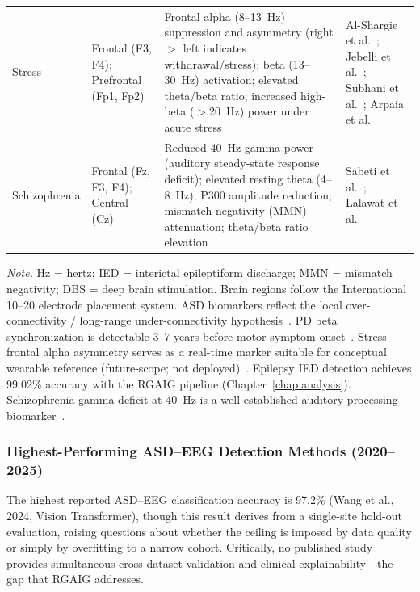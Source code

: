 \begin{table}[H]
\begin{tabularx}{\textwidth}{@{} >{\raggedright\arraybackslash}p{2.0cm} >{\raggedright\arraybackslash}p{2.0cm} L L @{}}
\addlinespace
Stress & Frontal (F3, F4); Prefrontal (Fp1, Fp2) & Frontal alpha (8--13~Hz) suppression and asymmetry (right $>$ left indicates withdrawal/stress); beta (13--30~Hz) activation; elevated theta/beta ratio; increased high-beta ($>$20~Hz) power under acute stress & Al-Shargie et al.~\cite{alshargie2018mental}; Jebelli et al.~\cite{jebelli2018eeg}; Subhani et al.~\cite{subhani2017stress}; Arpaia et al.~\cite{arpaia2020wearable} \\
\addlinespace
Schizophrenia & Frontal (Fz, F3, F4); Central (Cz) & Reduced 40~Hz gamma power (auditory steady-state response deficit); elevated resting theta (4--8~Hz); P300 amplitude reduction; mismatch negativity (MMN) attenuation; theta/beta ratio elevation & Sabeti et al.~\cite{sabeti2009entropy}; Lalawat et al.~\cite{lalawat2025fmri} \\
\bottomrule
\end{tabularx}
\vspace{0.5em}\noindent\textit{Note.} Hz = hertz; IED = interictal epileptiform discharge; MMN = mismatch negativity; DBS = deep brain stimulation. Brain regions follow the International 10--20 electrode placement system. ASD biomarkers reflect the local over-connectivity / long-range under-connectivity hypothesis~\cite{duffy2012coherence}. PD beta synchronization is detectable 3--7 years before motor symptom onset~\cite{geraedts2018eeg}. Stress frontal alpha asymmetry serves as a real-time marker suitable for conceptual wearable reference (future-scope; not deployed)~\cite{arpaia2020wearable}. Epilepsy IED detection achieves 99.02\% accuracy with the RGAIG pipeline (Chapter~\ref{chap:analysis}). Schizophrenia gamma deficit at 40~Hz is a well-established auditory processing biomarker~\cite{sabeti2009entropy}.
\end{table}
\fi %


\subsubsection{Highest-Performing ASD--EEG Detection Methods (2020--2025)}

The highest reported ASD--EEG classification accuracy is 97.2\% (Wang et al., 2024, Vision Transformer), though this result derives from a single-site hold-out evaluation, raising questions about whether the ceiling is imposed by data quality or simply by overfitting to a narrow cohort. Critically, no published study provides simultaneous cross-dataset validation and clinical explainability---the gap that RGAIG addresses.

